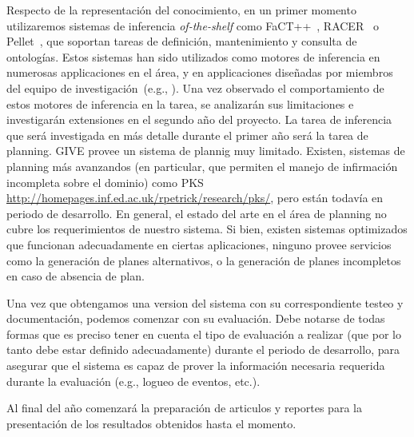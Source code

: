 Respecto de la representaci\'on del conocimiento, en un primer momento
utilizaremos sistemas de inferencia \emph{of-the-shelf} como
FaCT++~\citep{horr:fact99},
RACER~\citep{haar:race99} o Pellet~\citep{XXX}, que soportan tareas de
definici\'on, mantenimiento y consulta de ontolog\'ias.  Estos sistemas
han sido utilizados como motores de inferencia
en numerosas applicaciones en el \'area, y en applicaciones
dise\~nadas por miembros del equipo de
investigaci\'on~(e.g., \citep{FROLOG}).  Una vez observado el comportamiento de
estos motores de inferencia en la tarea, se analizar\'an sus limitaciones
e investigar\'an extensiones en el segundo a\~no del proyecto.  La tarea
de inferencia que ser\'a investigada en m\'as detalle durante el primer
a\~no ser\'a la tarea de planning.  GIVE provee un sistema de plannig muy
limitado.  Existen, sistemas de planning m\'as avanzandos (en particular,
que permiten el manejo de infirmaci\'on incompleta sobre el dominio)
como PKS \url{http://homepages.inf.ed.ac.uk/rpetrick/research/pks/}, pero
est\'an todav\'ia en periodo de desarrollo.  En general, el estado del
arte en el \'area de planning no cubre los requerimientos de nuestro
sistema.  Si bien, existen sistemas optimizados que funcionan adecuadamente
en ciertas aplicaciones, ninguno provee servicios como la generaci\'on de
planes alternativos, o la generaci\'on de planes incompletos en caso de
absencia de plan.

Una vez que obtengamos una version del sistema con su
correspondiente testeo y documentaci\'on, podemos comenzar con
su evaluaci\'on.  Debe notarse de todas formas que es preciso tener en cuenta
el tipo de evaluaci\'on a realizar (que por lo tanto debe estar definido
adecuadamente) durante el periodo de desarrollo, para asegurar que el sistema
es capaz de prover la informaci\'on necesaria requerida durante la evaluaci\'on
(e.g., logueo de eventos, etc.).

Al final del a\~no comenzar\'a la preparaci\'on de articulos y reportes para
la presentaci\'on de los resultados obtenidos hasta el momento.

